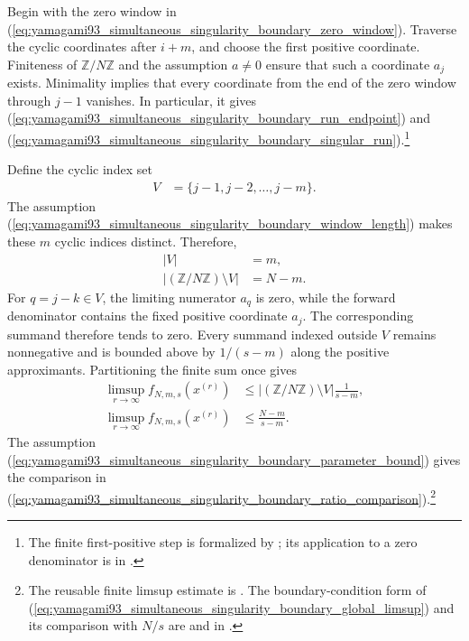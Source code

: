 \documentclass[11pt]{article}
\begin{document}
Begin with the zero window in
(\ref{eq:yamagami93_simultaneous_singularity_boundary_zero_window}). Traverse
the cyclic coordinates after $i+m$, and choose the first positive coordinate.
Finiteness of $\mathbb Z/N\mathbb Z$ and the assumption $a\neq 0$ ensure that
such a coordinate $a_j$ exists. Minimality implies that every coordinate from
the end of the zero window through $j-1$ vanishes. In particular, it gives
(\ref{eq:yamagami93_simultaneous_singularity_boundary_run_endpoint}) and
(\ref{eq:yamagami93_simultaneous_singularity_boundary_singular_run}).\footnote{The
finite first-positive step is formalized by
; its application to a
zero denominator is
 in
.}

Define the cyclic index set
\begin{align}
    V
        &=
        \{j-1,j-2,\ldots,j-m\}.
    \label{eq:yamagami93_simultaneous_singularity_boundary_vanishing_indices}
\end{align}
The assumption
(\ref{eq:yamagami93_simultaneous_singularity_boundary_window_length}) makes
these $m$ cyclic indices distinct. Therefore,
\begin{align}
    |V|
        &= m,
    \label{eq:yamagami93_simultaneous_singularity_boundary_vanishing_cardinality}\\
    \left|(\mathbb Z/N\mathbb Z)\setminus V\right|
        &= N-m.
    \label{eq:yamagami93_simultaneous_singularity_boundary_complement_cardinality}
\end{align}
For $q=j-k\in V$, the limiting numerator $a_q$ is zero, while the forward
denominator contains the fixed positive coordinate $a_j$. The corresponding
summand therefore tends to zero. Every summand indexed outside $V$ remains
nonnegative and is bounded above by $1/(s-m)$ along the positive
approximants. Partitioning the finite sum once gives
\begin{align}
    \limsup_{r\to\infty} f_{N,m,s}(x^{(r)})
        &\leq
        \left|(\mathbb Z/N\mathbb Z)\setminus V\right|
        \frac{1}{s-m},
    \label{eq:yamagami93_simultaneous_singularity_boundary_partition_bound}\\
    \limsup_{r\to\infty} f_{N,m,s}(x^{(r)})
        &\leq
        \frac{N-m}{s-m}.
    \label{eq:yamagami93_simultaneous_singularity_boundary_global_limsup}
\end{align}
The assumption
(\ref{eq:yamagami93_simultaneous_singularity_boundary_parameter_bound}) gives
the comparison in
(\ref{eq:yamagami93_simultaneous_singularity_boundary_ratio_comparison}).\footnote{The
reusable finite limsup estimate is
. The
boundary-condition form of
(\ref{eq:yamagami93_simultaneous_singularity_boundary_global_limsup}) and its
comparison with $N/s$ are
 and
 in
.}
\end{document}
